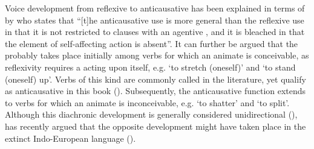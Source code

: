 Voice development from reflexive to anticausative has been explained in terms of  by \citet[45]{haspelmath:1990} who states that “[t]he anti\-cau\-sa\-tive use is more general than the reflexive use in that it is not restricted to clauses with an agentive , and it is bleached in that the element of self-affecting action is absent”. It can further be argued that the  probably takes place initially among verbs for which an animate  is conceivable, as reflexivity requires a  acting upon itself, e.g. ‘to stretch (oneself)’ and ‘to stand (oneself) up’. Verbs of this kind are commonly called  in the literature, yet qualify as anticausative in this book (). Subsequently, the anticausative function extends to verbs for which an animate  is inconceivable, e.g. ‘to shatter’ and ‘to split’. Although this diachronic development is generally considered unidirectional (), \citet{inglese:2020} has recently argued that the opposite development might have taken place in the extinct Indo-European language  ().

